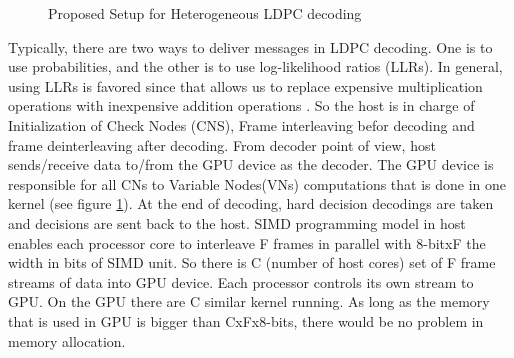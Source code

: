 \documentclass[conference]{IEEEtran}
\begin{document}
\begin{figure}[h]
\begin{centering}
\caption[width=.3\textwidth]{Proposed Setup for Heterogeneous LDPC decoding}
\label{fig_porposed_alg}
\end{centering}
\end{figure}

Typically, there are two ways to deliver messages in LDPC decoding. One is to use probabilities, and the other is to use log-likelihood ratios (LLRs). In general, using LLRs is favored since that allows us to replace expensive multiplication operations with inexpensive addition operations \cite{art_cuda_openmp}. So the host is in charge of Initialization of Check Nodes (CNS), Frame interleaving befor decoding and frame deinterleaving after decoding. From decoder point of view, host sends/receive data to/from the GPU device as the decoder. The GPU device is responsible for all CNs to Variable Nodes(VNs) computations that is done in one kernel (see figure \ref{fig_porposed_alg}). At the end of decoding, hard decision decodings are taken and decisions are sent back to the host.
SIMD programming model in host enables each processor core to interleave F frames in parallel with 8-bitxF the width in bits of SIMD unit. So there is C (number of host cores) set of F frame streams of data into GPU device. Each processor controls its own stream to GPU. On the GPU there are C similar kernel running. As long as the memory that is used in GPU is bigger than CxFx8-bits, there would be no problem in memory allocation. 
\end{document}
